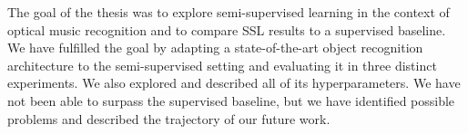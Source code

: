 The goal of the thesis was to explore semi-supervised learning in the context of optical music recognition and to compare SSL results to a supervised baseline. We have fulfilled the goal by adapting a state-of-the-art object recognition architecture to the semi-supervised setting and evaluating it in three distinct experiments. We also explored and described all of its hyperparameters. We have not been able to surpass the supervised baseline, but we have identified possible problems and described the trajectory of our future work.
